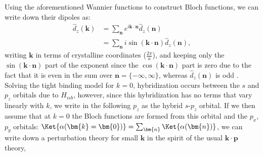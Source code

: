 Using the aforementioned Wannier functions to construct Bloch functions, we can write down their dipoles as:
\begin{align}
	\hat{d}_z(\bm{k}) &= \sum_{\bm{n}} e^{i \bm{k}\cdot \bm{n}}\hat{d}_z(\bm{n})\\
	&=\sum_{\bm{n}}i \sin(\bm{k}\cdot\bm{n}) \hat{d}_z(\bm{n}),
\end{align}
writing $\bm{k}$ in terms of crystalline coordinates ($\frac{2\pi}{a}$), and keeping only the $\sin(\bm{k}\cdot\bm{n})$ part of the exponent since the $\cos(\bm{k}\cdot\bm{n})$ part is zero due to the fact that it is even in the sum over $\bm{n} = \{-\infty, \infty\}$, whereas $\hat{d}_z(\bm{n})$ is odd . Solving the tight binding model for $k=0$, hybridization occurs between the $s$ and $p_z$ orbitals due to $H_{isb}$, however, since this hybridization has no terms that vary linearly with $k$, we write in the following $p_z$ as the hybrid $s$-$p_z$ orbital. If we then assume that at $k=0$ the Bloch functions are formed from this orbital and the $p_x$,$p_y$ orbitals: $\Ket{\alpha(\bm{k}=\bm{0})} = \sum_{\bm{n}} \Ket{\alpha(\bm{n})}$, we can write down a perturbation theory for small $\bm{k}$ in the spirit of the usual $\bm{k}\cdot\bm{p}$ theory,

